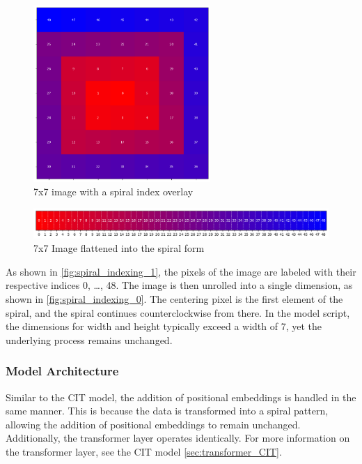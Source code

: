     
    \begin{figure}[H]
    \centering
    \includegraphics[width=0.6\textwidth]{../code/dataAnalysis/plots/exampleImgs/spiralShowcase1.png}
    \caption{7x7 image with a spiral index overlay}
    \label{fig:spiral_indexing_1}        
    \end{figure}

    \begin{figure}[H]
    \centering
    \includegraphics[width=1\textwidth]{../code/dataAnalysis/plots/exampleImgs/spiralShowcase0.png}
    \caption{7x7 Image flattened into the spiral form} 
    \label{fig:spiral_indexing_0}        
    \end{figure}

    As shown in \autoref{fig:spiral_indexing_1}, the pixels of the image are labeled with their respective indices 0, \dots, 48. The image is then unrolled into a single dimension, as shown in \autoref{fig:spiral_indexing_0}. The centering pixel is the first element of the spiral, and the spiral continues counterclockwise from there. In the model script, the dimensions for width and height typically exceed a width of 7, yet the underlying process remains unchanged.



\subsubsection{Model Architecture}

Similar to the CIT model, the addition of positional embeddings is handled in the same manner. This is because the data is transformed into a spiral pattern, allowing the addition of positional embeddings to remain unchanged. Additionally, the transformer layer operates identically. For more information on the transformer layer, see the CIT model \autoref{sec:transformer_CIT}.


